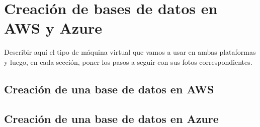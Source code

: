 \chapter{Creación de bases de datos en AWS y Azure}
Describir aquí el tipo de máquina virtual que vamos a usar en ambas plataformas y luego, en cada sección, poner los pasos a seguir con sus fotos correspondientes.
\section{Creación de una base de datos en AWS}


\section{Creación de una base de datos en Azure}
